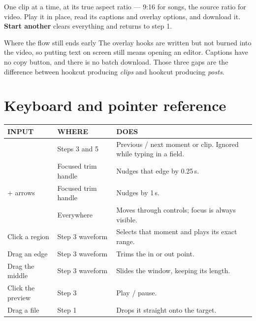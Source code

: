 \documentclass[11pt,a4paper]{article}
\newcommand{\key}[1]{%
  \tcbox[on line, boxsep=1pt, left=3pt, right=3pt, top=1pt, bottom=1pt,
         colback=cardbg, colframe=rulec, boxrule=0.5pt, arc=2pt]
        {\ttfamily\footnotesize #1}}
\begin{document}
One clip at a time, at its true aspect ratio --- 9:16 for songs, the source
ratio for video. Play it in place, read its captions and overlay options, and
download it. \textbf{Start another} clears everything and returns to step 1.

\begin{warn}{Where the flow still ends early}
The overlay hooks are written but not burned into the video, so putting text on
screen still means opening an editor. Captions have no copy button, and there is
no batch download. Those three gaps are the difference between hookcut producing
\textit{clips} and hookcut producing \textit{posts}.
\end{warn}

\section{Keyboard and pointer reference}

\begin{tabularx}{\linewidth}{@{}p{3.6cm} p{3.4cm} X@{}}
\toprule
{\sffamily\footnotesize\color{muted}INPUT} &
{\sffamily\footnotesize\color{muted}WHERE} &
{\sffamily\footnotesize\color{muted}DOES} \\
\midrule
\key{$\leftarrow$} \key{$\rightarrow$} & Steps 3 and 5 & \small Previous / next moment or clip. Ignored while typing in a field. \\[3pt]
\key{$\leftarrow$} \key{$\rightarrow$} & Focused trim handle & \small Nudges that edge by 0.25\,s. \\[3pt]
\key{Shift} + arrows & Focused trim handle & \small Nudges by 1\,s. \\[3pt]
\key{Tab} & Everywhere & \small Moves through controls; focus is always visible. \\[3pt]
Click a region & Step 3 waveform & \small Selects that moment and plays its exact range. \\[3pt]
Drag an edge & Step 3 waveform & \small Trims the in or out point. \\[3pt]
Drag the middle & Step 3 waveform & \small Slides the window, keeping its length. \\[3pt]
Click the preview & Step 3 & \small Play / pause. \\[3pt]
Drag a file & Step 1 & \small Drops it straight onto the target. \\
\bottomrule
\end{tabularx}
\end{document}
